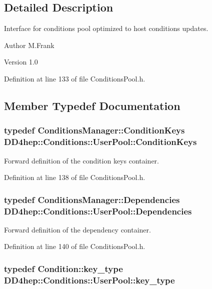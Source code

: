 \subsection{Detailed Description}
Interface for conditions pool optimized to host conditions updates. \begin{DoxyAuthor}{Author}
M.Frank 
\end{DoxyAuthor}
\begin{DoxyVersion}{Version}
1.0 
\end{DoxyVersion}


Definition at line 133 of file ConditionsPool.h.

\subsection{Member Typedef Documentation}
\hypertarget{class_d_d4hep_1_1_conditions_1_1_user_pool_a6282d01af77401a4c20f08391d18cc95}{
\subsubsection[{ConditionKeys}]{\setlength{\rightskip}{0pt plus 5cm}typedef {\bf ConditionsManager::ConditionKeys} {\bf DD4hep::Conditions::UserPool::ConditionKeys}}}
\label{class_d_d4hep_1_1_conditions_1_1_user_pool_a6282d01af77401a4c20f08391d18cc95}


Forward definition of the condition keys container. 

Definition at line 138 of file ConditionsPool.h.\hypertarget{class_d_d4hep_1_1_conditions_1_1_user_pool_a0da9a8bee4190e4deebf83102902118d}{
\subsubsection[{Dependencies}]{\setlength{\rightskip}{0pt plus 5cm}typedef {\bf ConditionsManager::Dependencies} {\bf DD4hep::Conditions::UserPool::Dependencies}}}
\label{class_d_d4hep_1_1_conditions_1_1_user_pool_a0da9a8bee4190e4deebf83102902118d}


Forward definition of the dependency container. 

Definition at line 140 of file ConditionsPool.h.\hypertarget{class_d_d4hep_1_1_conditions_1_1_user_pool_aa256cf1e22de1b9f2a84d39309b8bfa9}{
\subsubsection[{key\_\-type}]{\setlength{\rightskip}{0pt plus 5cm}typedef {\bf Condition::key\_\-type} {\bf DD4hep::Conditions::UserPool::key\_\-type}}}
\label{class_d_d4hep_1_1_conditions_1_1_user_pool_aa256cf1e22de1b9f2a84d39309b8bfa9}



